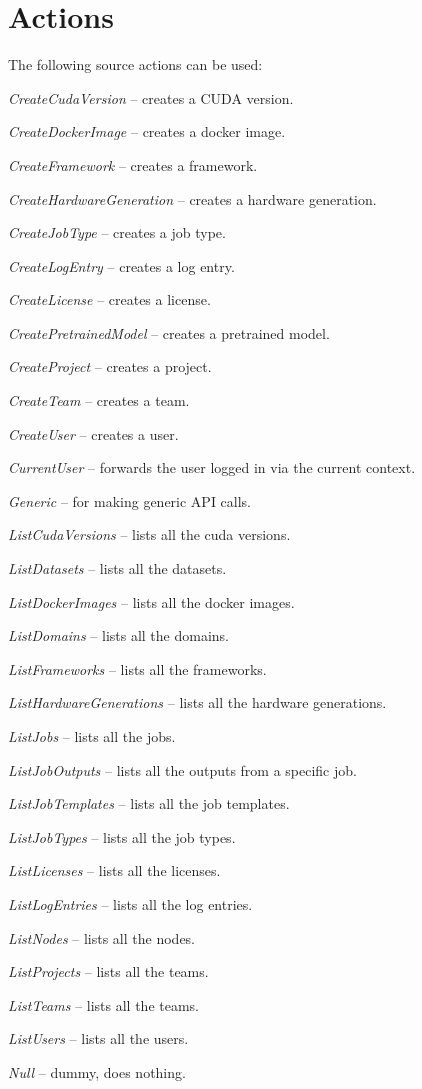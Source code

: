 \documentclass[a4paper]{book}
\begin{document}
\section{Actions}
The following source actions can be used:
\begin{tight_itemize}
  \item \textit{CreateCudaVersion} -- creates a CUDA version.
  \item \textit{CreateDockerImage} -- creates a docker image.
  \item \textit{CreateFramework} -- creates a framework.
  \item \textit{CreateHardwareGeneration} -- creates a hardware generation.
  \item \textit{CreateJobType} -- creates a job type.
  \item \textit{CreateLogEntry} -- creates a log entry.
  \item \textit{CreateLicense} -- creates a license.
  \item \textit{CreatePretrainedModel} -- creates a pretrained model.
  \item \textit{CreateProject} -- creates a project.
  \item \textit{CreateTeam} -- creates a team.
  \item \textit{CreateUser} -- creates a user.
  \item \textit{CurrentUser} -- forwards the user logged in via the current context.
  \item \textit{Generic} -- for making generic API calls.
  \item \textit{ListCudaVersions} -- lists all the cuda versions.
  \item \textit{ListDatasets} -- lists all the datasets.
  \item \textit{ListDockerImages} -- lists all the docker images.
  \item \textit{ListDomains} -- lists all the domains.
  \item \textit{ListFrameworks} -- lists all the frameworks.
  \item \textit{ListHardwareGenerations} -- lists all the hardware generations.
  \item \textit{ListJobs} -- lists all the jobs.
  \item \textit{ListJobOutputs} -- lists all the outputs from a specific job.
  \item \textit{ListJobTemplates} -- lists all the job templates.
  \item \textit{ListJobTypes} -- lists all the job types.
  \item \textit{ListLicenses} -- lists all the licenses.
  \item \textit{ListLogEntries} -- lists all the log entries.
  \item \textit{ListNodes} -- lists all the nodes.
  \item \textit{ListProjects} -- lists all the teams.
  \item \textit{ListTeams} -- lists all the teams.
  \item \textit{ListUsers} -- lists all the users.
  \item \textit{Null} -- dummy, does nothing.
\end{tight_itemize}
\end{document}
